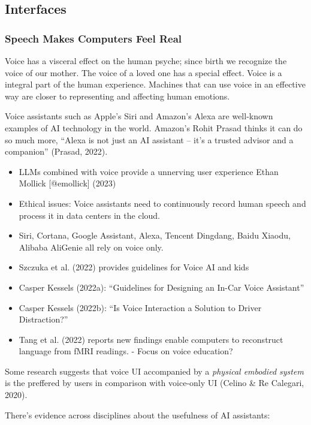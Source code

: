 \documentclass[
  letterpaper,
  DIV=11,
  numbers=noendperiod]{scrartcl}
\providecommand{\tightlist}{%
  \setlength{\itemsep}{0pt}\setlength{\parskip}{0pt}}\usepackage{longtable,booktabs,array}
\begin{document}
\subsection{Interfaces}\label{interfaces}

\subsubsection{Speech Makes Computers Feel
Real}\label{speech-makes-computers-feel-real}

Voice has a visceral effect on the human psyche; since birth we
recognize the voice of our mother. The voice of a loved one has a
special effect. Voice is a integral part of the human experience.
Machines that can use voice in an effective way are closer to
representing and affecting human emotions.

Voice assistants such as Apple's Siri and Amazon's Alexa are well-known
examples of AI technology in the world. Amazon's Rohit Prasad thinks it
can do so much more, ``Alexa is not just an AI assistant -- it's a
trusted advisor and a companion'' (Prasad, 2022).

\begin{itemize}
\tightlist
\item
  LLMs combined with voice provide a unnerving user experience Ethan
  Mollick {[}@emollick{]} (2023)
\item
  Ethical issues: Voice assistants need to continuously record human
  speech and process it in data centers in the cloud.
\item
  Siri, Cortana, Google Assistant, Alexa, Tencent Dingdang, Baidu
  Xiaodu, Alibaba AliGenie all rely on voice only.
\item
  Szczuka et al. (2022) provides guidelines for Voice AI and kids
\item
  Casper Kessels (2022a): ``Guidelines for Designing an In-Car Voice
  Assistant''
\item
  Casper Kessels (2022b): ``Is Voice Interaction a Solution to Driver
  Distraction?''
\item
  Tang et al. (2022) reports new findings enable computers to
  reconstruct language from fMRI readings. - Focus on voice education?
\end{itemize}

Some research suggests that voice UI accompanied by a \emph{physical
embodied system} is the preffered by users in comparison with voice-only
UI (Celino \& Re Calegari, 2020).

There's evidence across disciplines about the usefulness of AI
assistants:
\end{document}
